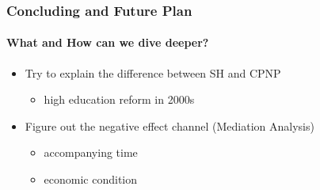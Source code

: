 \documentclass{beamer}
\begin{document}
\begin{frame} %
\frametitle{Concluding and Future Plan}
\framesubtitle{What and How can we dive deeper?}

    \begin{itemize}
        \item Try to explain the difference between SH and CPNP
        \begin{itemize}
            \item high education reform in 2000s
        \end{itemize}
        \item Figure out the negative effect channel (Mediation Analysis)
        \begin{itemize}
            \item accompanying time
            \item economic condition
        \end{itemize}
    \end{itemize}

\end{frame}
\end{document}
